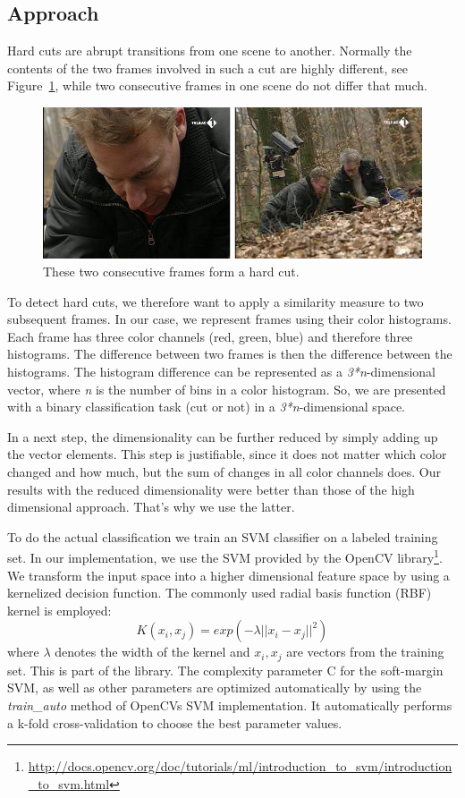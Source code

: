 \subsection{Approach}
\label{sec:hard_cut_approach}

Hard cuts are abrupt transitions from one scene to another.
Normally the contents of the two frames involved in such a cut are highly different, see Figure~\ref{fig:hard_cut_example}, while two consecutive frames in one scene do not differ that much.

\begin{figure}[ht]
	\centering
	\includegraphics[scale=.7]{images/hard_cut_example.png}
	\caption{These two consecutive frames form a hard cut.}
	\label{fig:hard_cut_example}
\end{figure}

To detect hard cuts, we therefore want to apply a similarity measure to two subsequent frames.
In our case, we represent frames using their color histograms.
Each frame has three color channels (red, green, blue) and therefore three histograms.
The difference between two frames is then the difference between the histograms.
The histogram difference can be represented as a \emph{3*n}-dimensional vector, where \emph{n} is the number of bins in a color histogram.
So, we are presented with a binary classification task (cut or not) in a \emph{3*n}-dimensional space.

In a next step, the dimensionality can be further reduced by simply adding up the vector elements.
This step is justifiable, since it does not matter which color changed and how much, but the sum of changes in all color channels does.
Our results with the reduced dimensionality were better than those of the high dimensional approach.
That's why we use the latter.

To do the actual classification we train an SVM classifier on a labeled training set.
In our implementation, we use the SVM provided by the OpenCV library\footnote{\url{http://docs.opencv.org/doc/tutorials/ml/introduction_to_svm/introduction_to_svm.html}}.
We transform the input space into a higher dimensional feature space by using a kernelized decision function. The commonly used radial basis function (RBF) kernel is employed:
$$K(x_i,x_j) = exp(-\lambda || x_i - x_j ||^2)$$
where $\lambda$ denotes the width of the kernel and $x_i, x_j $ are vectors from the training set.
This is part of the library.
The complexity parameter C for the soft-margin SVM, as well as other parameters are optimized automatically by using the \emph{train\_auto} method of OpenCVs SVM implementation.
It automatically performs a k-fold cross-validation to choose the best parameter values.

